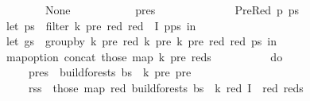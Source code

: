 \begin{isabellebody}
\ \ \ \ \ \ \ \ \ \ \ \ {\isacharbar}{\kern0pt}\ {\isacharunderscore}{\kern0pt}\ {\isasymRightarrow}\ None\isanewline
\ \ \ \ \ \ \ \ \ \ {\isacharparenright}{\kern0pt}\ pres{\isacharparenright}{\kern0pt}\isanewline
\ \ \ \ \ \ \ \ {\isacharbraceright}{\kern0pt}{\isacharparenright}{\kern0pt}\isanewline
\ \ \ \ {\isacharbar}{\kern0pt}\ PreRed\ p\ ps\ {\isasymRightarrow}\ {\isacharparenleft}{\kern0pt}\isanewline
\ \ \ \ \ \ \ \ let\ ps{\isacharprime}{\kern0pt}\ {\isacharequal}{\kern0pt}\ filter\ {\isacharparenleft}{\kern0pt}{\isasymlambda}{\isacharparenleft}{\kern0pt}k{\isacharprime}{\kern0pt}{\isacharcomma}{\kern0pt}\ pre{\isacharcomma}{\kern0pt}\ red{\isacharparenright}{\kern0pt}{\isachardot}{\kern0pt}\ red\ {\isasymnotin}\ I{\isacharparenright}{\kern0pt}\ {\isacharparenleft}{\kern0pt}p{\isacharhash}{\kern0pt}ps{\isacharparenright}{\kern0pt}\ in\isanewline
\ \ \ \ \ \ \ \ let\ gs\ {\isacharequal}{\kern0pt}\ group{\isacharunderscore}{\kern0pt}by\ {\isacharparenleft}{\kern0pt}{\isasymlambda}{\isacharparenleft}{\kern0pt}k{\isacharprime}{\kern0pt}{\isacharcomma}{\kern0pt}\ pre{\isacharcomma}{\kern0pt}\ red{\isacharparenright}{\kern0pt}{\isachardot}{\kern0pt}\ {\isacharparenleft}{\kern0pt}k{\isacharprime}{\kern0pt}{\isacharcomma}{\kern0pt}\ pre{\isacharparenright}{\kern0pt}{\isacharparenright}{\kern0pt}\ {\isacharparenleft}{\kern0pt}{\isasymlambda}{\isacharparenleft}{\kern0pt}k{\isacharprime}{\kern0pt}{\isacharcomma}{\kern0pt}\ pre{\isacharcomma}{\kern0pt}\ red{\isacharparenright}{\kern0pt}{\isachardot}{\kern0pt}\ red{\isacharparenright}{\kern0pt}\ ps{\isacharprime}{\kern0pt}\ in\isanewline
\ \ \ \ \ \ \ \ map{\isacharunderscore}{\kern0pt}option\ concat\ {\isacharparenleft}{\kern0pt}those\ {\isacharparenleft}{\kern0pt}map\ {\isacharparenleft}{\kern0pt}{\isasymlambda}{\isacharparenleft}{\kern0pt}{\isacharparenleft}{\kern0pt}k{\isacharprime}{\kern0pt}{\isacharcomma}{\kern0pt}\ pre{\isacharparenright}{\kern0pt}{\isacharcomma}{\kern0pt}\ reds{\isacharparenright}{\kern0pt}{\isachardot}{\kern0pt}\isanewline
\ \ \ \ \ \ \ \ \ \ do\ {\isacharbraceleft}{\kern0pt}\isanewline
\ \ \ \ \ \ \ \ \ \ \ \ pres\ {\isasymleftarrow}\ build{\isacharunderscore}{\kern0pt}forests{\isacharprime}{\kern0pt}\ bs\ {\isasymomega}\ k{\isacharprime}{\kern0pt}\ pre\ {\isacharbraceleft}{\kern0pt}pre{\isacharbraceright}{\kern0pt}{\isacharsemicolon}{\kern0pt}\isanewline
\ \ \ \ \ \ \ \ \ \ \ \ rss\ {\isasymleftarrow}\ those\ {\isacharparenleft}{\kern0pt}map\ {\isacharparenleft}{\kern0pt}{\isasymlambda}red{\isachardot}{\kern0pt}\ build{\isacharunderscore}{\kern0pt}forests{\isacharprime}{\kern0pt}\ bs\ {\isasymomega}\ k\ red\ {\isacharparenleft}{\kern0pt}I\ {\isasymunion}\ {\isacharbraceleft}{\kern0pt}red{\isacharbraceright}{\kern0pt}{\isacharparenright}{\kern0pt}{\isacharparenright}{\kern0pt}\ reds{\isacharparenright}{\kern0pt}{\isacharsemicolon}{\kern0pt}\isanewline

\end{isabellebody}
